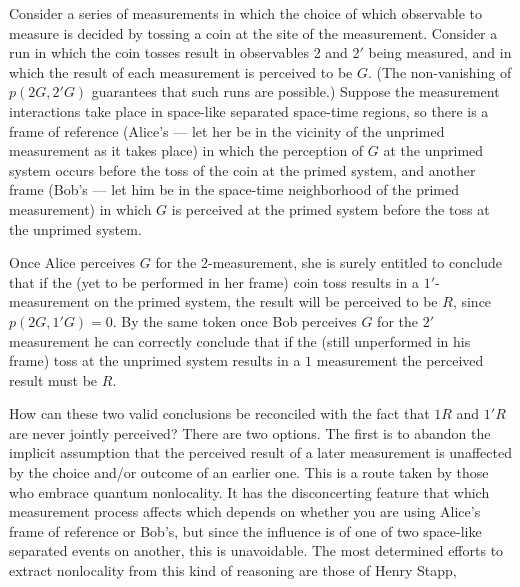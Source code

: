 Consider a series of measurements in which the choice of which
observable to measure is decided by tossing a coin at the site of the
measurement.  Consider a run in which the coin tosses result
in observables 2 and 2$'$ being measured, and in which the result of
each measurement is perceived to be $G$.  (The non-vanishing of
$p(2G,2'G)$ guarantees that such runs are possible.)  Suppose the
measurement interactions take place in space-like separated space-time
regions, so there is a frame of reference (Alice's --- let her be
in the vicinity of the unprimed measurement as it takes place) in
which the perception of $G$ at the unprimed system occurs before the
toss of the coin at the primed system, and another frame (Bob's ---
let him be in the space-time neighborhood of the primed measurement) in
which $G$ is perceived at the primed system before the toss at the
unprimed system. 

Once Alice perceives $G$ for the 2-measurement, she is surely entitled
to conclude that if the (yet to be performed in her frame) coin toss
results in a $1'$-measurement on the primed system, the result will be
perceived to be $R$, since $p(2G,1'G) = 0.$ By the same token once Bob
perceives $G$ for the $2'$ measurement he can correctly conclude that
if the (still unperformed in his frame) toss at the unprimed system
results in a $1$ measurement the perceived result must be $R$.  

How can these two valid conclusions be reconciled with the fact that
$1R$ and $1'R$ are never jointly perceived? There are two options.
The first is to abandon the implicit assumption that the perceived
result of a later measurement is unaffected by the choice and/or
outcome of an earlier one.  This is a route taken by those who
embrace quantum nonlocality.  It has the disconcerting feature that
which measurement process affects which depends on whether you are
using Alice's frame of reference or Bob's, but since the influence is
of one of two space-like separated events on another, this is
unavoidable.  The most determined efforts to extract nonlocality from
this kind of reasoning are those of Henry Stapp,\fn

